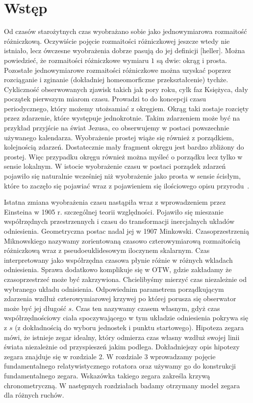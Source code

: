 \section{Wstęp}
Od czasów starożytnych czas wyobrażano sobie jako jednowymiarowa 
rozmaitość różniczkową. 
Oczywiście pojęcie rozmaitości różniczkowej jeszcze wtedy nie istniało, 
lecz ówczesne wyobrażenia dobrze pasują do jej definicji [heller]. 
Można powiedzieć, że rozmaitości różniczkowe 
 wymiaru $1$ są dwie: okrąg i prosta. 
Pozostałe jednowymiarowe rozmaitości różniczkowe można uzyskać 
poprzez rozciąganie i zginanie (dokładniej homeomorficzne przekształcenie) 
tychże. 
Cykliczność obserwowanych zjawisk takich jak pory roku, cylk faz 
Księżyca, dały początek pierwszym miarom czasu. 
Prowadzi to do koncepcji czasu periodycznego, który możemy 
utożsamiać z okręgiem. 
Okrąg taki zostaje rozcięty przez zdarzenie, które występuje 
jednokrotnie. Takim zdarzeniem może być na przykład 
przyjście na świat Jezusa, co obserwujemy w postaci powszechnie 
używanego kalendarza. 
Wyobrażenie prostej wiąże się również z porządkiem, 
kolejnością zdarzeń. 
Dostatecznie mały fragment okręgu jest bardzo zbliżony do
prostej. Więc przypadku okręgu również można myśleć o
 porządku lecz tylko w sensie lokalnym. 
W istocie wyobrażenie czasu w postaci porządek zdarzeń
pojawiło się naturalnie wcześniej niż wyobrażenie jako prosta 
w sensie ścisłym, które to zaczęło się pojawiać wraz 
z pojawieniem się ilościowego opisu przyrodu~\cite{czas}.


Istatna zmiana wyobrażenia czasu nastąpiła wraz z wprowadzeniem przez 
Einsteina w 1905 r. szczególnej teorii względności. 
Pojawiło się mieszanie współrzędnych przestrzennych i czasu do transformacji 
inercjalnych układów odniesienia. 
Geometryczna postac nadal jej w 1907 Minkowski. 
Czasoprzestrzenią Miknowskiego nazywamy
zorientowaną czasowo czterowymiarową 
rozmaitością różniczkową wraz z pseudoeuklidesowym 
iloczynem skalarnym.
Czas interpretowany jako współrzędna czasowa 
płynie różnie w różnych wkladach odniesienia. 
Sprawa dodatkowo komplikuje się w OTW, gdzie zakładamy 
że czasoprzestrzeć może być zakrzywiona.
Chcielibyśmy mierzyć czas niezależnie od wybranego układu odnisienia. 
Odpowiednim parametrem porządkującym zdarzenia wzdłuż 
czterowymiarowej krzywej 
po której porusza się obserwator może być jej długość $s$. 
Czas ten nazywamy czasem własnym, gdyż czas współrzędnościowy 
ciała spoczywającego w 
tym układzie odniesienia pokrywa się z $s$ (z dokładnością do 
wyboru jednostek i punktu startowego). Hipoteza zegara
mówi, że istnieje zegar idealny, który odmierza czas własny 
wzdłuż swojej linii świata niezależnie od przyspieszeń 
jakim podlega.
Dokładniejszy opis hipotezy zegara znajduje się w 
rozdziale 2. W rozdziale 3 wprowadzamy pojęcie 
fundamentalnego relatywistycznego rotatora oraz 
używamy go do konstrukcji fundamentalnego zegara.
Wskazówka takiego zegara zakreśla krzywą chronometryczną.
W następnych rozdziałach badamy otrzymany model zegara
dla różnych ruchów.
